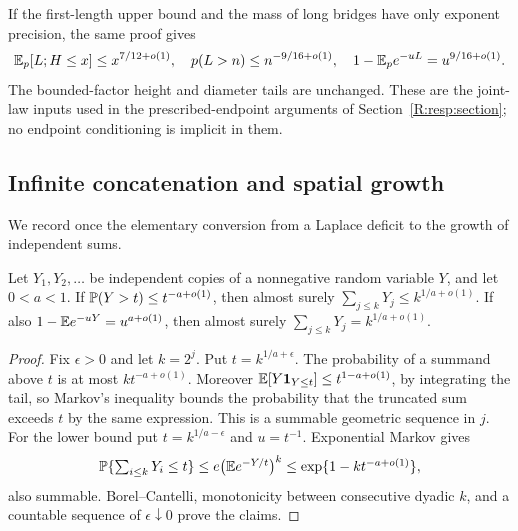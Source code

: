 \begin{remark}\label{R:renew:weak-scope}
If the first-length upper bound and the mass of long bridges have only exponent precision, the same proof gives
\[
 \mathbb E_p[L;H\le x]\le x^{7/12+o(1)},\quad
 p(L>n)\le n^{-9/16+o(1)},\quad
 1-\mathbb E_p e^{-uL}=u^{9/16+o(1)}.
\]
The bounded-factor height and diameter tails are unchanged. These are the joint-law inputs used in the prescribed-endpoint arguments of Section~\ref{R:resp:section}; no endpoint conditioning is implicit in them.
\end{remark}

\subsection{Infinite concatenation and spatial growth}
We record once the elementary conversion from a Laplace deficit to the growth of independent sums.
\begin{lemma}\label{R:renew:growth}
Let $Y_1,Y_2,\ldots$ be independent copies of a nonnegative random variable $Y$, and let $0<a<1$. If $\mathbb P(Y>t)\le t^{-a+o(1)}$, then almost surely
$\sum_{j\le k}Y_j\le k^{1/a+o(1)}$. If also
$1-\mathbb E e^{-uY}=u^{a+o(1)}$, then almost surely
$\sum_{j\le k}Y_j=k^{1/a+o(1)}$.
\end{lemma}
\begin{proof}
Fix $\epsilon>0$ and let $k=2^j$. Put $t=k^{1/a+\epsilon}$. The probability of a summand above $t$ is at most $k t^{-a+o(1)}$. Moreover
$\mathbb E[Y\mathbf1_{Y\le t}]\le t^{1-a+o(1)}$, by integrating the tail, so Markov's inequality bounds the probability that the truncated sum exceeds $t$ by the same expression. This is a summable geometric sequence in $j$. For the lower bound put $t=k^{1/a-\epsilon}$ and $u=t^{-1}$. Exponential Markov gives
\[
 \mathbb P\{\textstyle\sum_{i\le k}Y_i\le t\}
 \le e\big(\mathbb E e^{-Y/t}\big)^k
 \le\exp\{1-k t^{-a+o(1)}\},
\]
also summable. Borel--Cantelli, monotonicity between consecutive dyadic $k$, and a countable sequence of $\epsilon\downarrow0$ prove the claims.
\end{proof}

